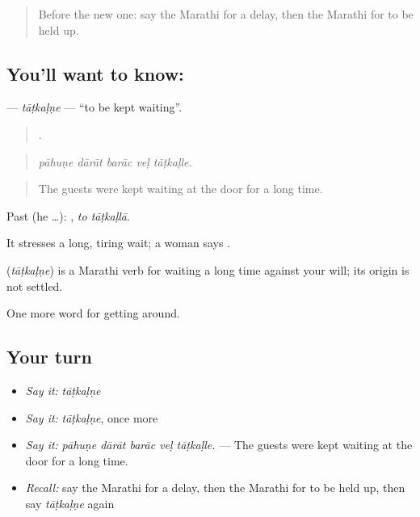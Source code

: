 \label{lesson:MR-C397-tatkalne}



\begin{quote}
Before the new one: say the Marathi for a delay, then the Marathi for to be held up.
\end{quote}

\subsection*{You'll want to know: }
\textbf{} — \emph{tāṭkaḷṇe} — \textquotedblleft{}to be kept waiting\textquotedblright{}.

\begin{quote}
    .
\end{quote}

\begin{quote}
\emph{pāhuṇe dārāt barāc veḷ tāṭkaḷle.}
\end{quote}

\begin{quote}
The guests were kept waiting at the door for a long time.
\end{quote}

Past (he …):  , \emph{to tāṭkaḷlā}.

It stresses a long, tiring wait; a woman says  .

\begin{cousinweb}
\textbf{} (\emph{tāṭkaḷṇe}) is a Marathi verb for waiting a long time against your will; its origin is not settled.
\end{cousinweb}

\begin{grammarlens}[title={What you've built}]
One more word for getting around.
\end{grammarlens}

\subsection*{Your turn}
\begin{itemize}
\raggedright
  \item \emph{Say it:} \emph{tāṭkaḷṇe}
  \item \emph{Say it:} \emph{tāṭkaḷṇe}, once more
  \item \emph{Say it:} \emph{pāhuṇe dārāt barāc veḷ tāṭkaḷle.} — The guests were kept waiting at the door for a long time.
  \item \emph{Recall:} say the Marathi for a delay, then the Marathi for to be held up, then say \emph{tāṭkaḷṇe} again
\end{itemize}

